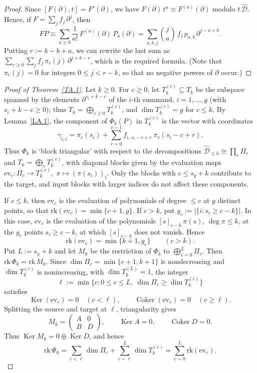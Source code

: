 \documentclass[11pt,reqno]{amsart}
\theoremstyle{plain}
\theoremstyle{definition}
\theoremstyle{remark}
\numberwithin{equation}{section}
\newcommand{\cD}{\mathcal{D}}
\newcommand{\del}{\partial}
\newcommand{\hD}{\widehat{\cD}}
\newcommand{\ff}[2]{[#1]_{#2}}          %
\DeclareMathOperator{\Ker}{Ker}
\DeclareMathOperator{\Coker}{Coker}
\begin{document}
\begin{proof}
Since $[F(\del), t] = F'(\del)$, we have $F(\del)\, t^a \equiv F^{(a)}(\del)$ modulo $t\,\hD$.
Hence, if $F = \sum_j f_j\, \del^j$, then
\[
  F P \equiv \sum_{a \ge 0} \frac{1}{a!}\, F^{(a)}(\del)\, P_a(\del) = \sum_{a, b, j} \binom{j}{a}\,
  f_j\, p_{a,b}\, \del^{j - a + b} .
\]
Putting $r := k - b + a$, we can rewrite the last sum as $\sum_{r \ge 0} \sum_j f_j\, \pi_r(j)\,
\del^{j + k - r}$, which is the required formula. (Note that $\pi_r(j) = 0$ for integers
$0 \le j < r - k$, so that no negative powers of $\del$ occur.)
\end{proof}
%
\begin{proof}[Proof of Theorem~\ref{TA.1}]
Let $k \ge 0$. For $c \ge 0$, let $T_k^{(c)} \subseteq T_k$ be the subspace spanned by the
elements $\del^{s_i + k - c}$ of the $i$-th summand, $i = 1, \ldots, g$ (with $s_i + k - c \ge
0$); thus $T_k = \bigoplus_{c \ge 0} T_k^{(c)}$, and $\dim T_k^{(c)} = g$ for $c \le k$. By
Lemma~\ref{LA.1}, the component of $\Phi_k(P)$ in $T_k^{(c)}$ is the vector with coordinates
\begin{equation}
\label{EA4}
  \gamma_{i,c} = \pi_c(s_i) + \sum_{r=0}^{c-1} f_{i,\, s_i - c + r}\ \pi_r(s_i - c + r) .
\end{equation}
Thus $\Phi_k$ is `block triangular' with respect to the decompositions $\hD_{\le k} \cong \prod_r
\Pi_r$ and $T_k = \bigoplus_c T_k^{(c)}$, with diagonal blocks given by the evaluation maps
$\mathrm{ev}_c : \Pi_c \to T_k^{(c)}$, $\,\pi \mapsto (\pi(s_i))_i$. Only the blocks with
$c \le s_g + k$ contribute to the target, and input blocks with larger indices do not affect
these components.

If $c \le k$, then $\mathrm{ev}_c$ is the evaluation of polynomials of degree $\le c$ at $g$
distinct points, so that $\mathrm{rk}(\mathrm{ev}_c) = \min\{c+1, g\}$. If $c > k$, put
$g_c := |\{i : s_i \ge c-k\}|$. In this case, $\mathrm{ev}_c$ is the evaluation of the
polynomials $\ff{s}{c-k}\,\pi(s)$, $\deg \pi \le k$, at the $g_c$ points $s_i \ge c-k$, at
which $\ff{s}{c-k}$ does not vanish. Hence
\[
  \mathrm{rk}(\mathrm{ev}_c) = \min\{k+1, g_c\} \qquad (c > k) .
\]
Put $L:=s_g+k$ and let $M_k$ be the restriction of $\Phi_k$ to
$\bigoplus_{c=0}^{L}\Pi_c$. Then $\mathrm{rk}\,\Phi_k=\mathrm{rk}\,M_k$. Since
$\dim\Pi_c=\min\{c+1,k+1\}$ is nondecreasing and $\dim T_k^{(c)}$ is nonincreasing, with
$\dim T_k^{(L)}=1$, the integer
\[
  \ell := \min\{c:0\le c\le L,\ \dim\Pi_c\ge\dim T_k^{(c)}\}
\]
satisfies
\[
  \Ker(\mathrm{ev}_c)=0 \quad (c<\ell), \qquad
  \Coker(\mathrm{ev}_c)=0 \quad (c\ge\ell).
\]
Splitting the source and target at $\ell$, triangularity gives
\[
  M_k=\begin{pmatrix} A&0\\ B&D\end{pmatrix}, \qquad
  \Ker A=0, \qquad \Coker D=0.
\]
Thus $\Ker M_k=0\oplus\Ker D$, and hence
\[
  \mathrm{rk}\,\Phi_k
  =\sum_{c<\ell}\dim\Pi_c+\sum_{c=\ell}^{L}\dim T_k^{(c)}
  =\sum_{c=0}^{L}\mathrm{rk}(\mathrm{ev}_c).
\]


\end{proof}
\end{document}
